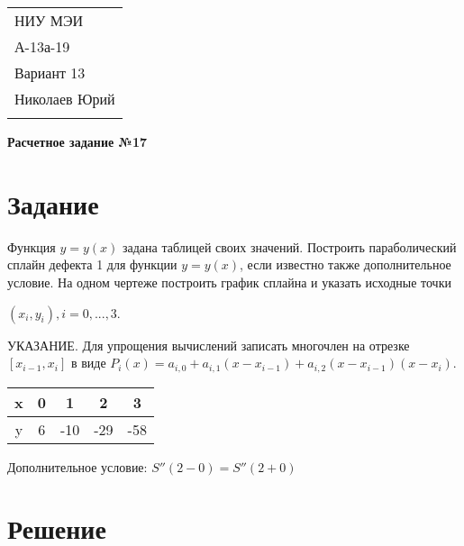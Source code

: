 \documentclass[a4paper,12pt]{article} %
\begin{document}
\thispagestyle{empty} 

\begin{tabular}{p{15.5cm}} 
НИУ МЭИ \\ А-13а-19  \\ Вариант 13 \\ Николаев Юрий\\
\hline 
\\
\end{tabular} 

\vspace*{0.3cm}

\begin{center} 
	{\Large \bf Расчетное задание №17} 
	\vspace{2mm}
\end{center}  

\vspace{0.4cm}


\section{Задание}
Функция $y = y(x)$ задана таблицей своих значений. Построить параболический сплайн дефекта 1 для функции $y = y(x)$, если известно также дополнительное условие. На одном чертеже построить график сплайна и указать исходные точки 

$(x_i, y_i), i = 0, ..., 3$.

\vspace{0.4cm}

УКАЗАНИЕ. Для упрощения вычислений записать многочлен на отрезке $[x_{i - 1}, x_i]$ в виде $P_i(x) = a_{i, 0} + a_{i, 1}(x - x_{i - 1}) + a_{i, 2}(x - x_{i - 1})(x - x_i)$.

\begin{center}
\begin{tabular}{| c | c | c | c | c |}
\hline
    x & 0 & 1 & 2 & 3 \\ \hline
    y & 6 & -10 & -29 & -58 \\
\hline
\end{tabular}

\vspace{0.4cm}

Дополнительное условие: $S''(2 - 0) = S''(2 + 0)$
\end{center}

\section{Решение}
\end{document}
